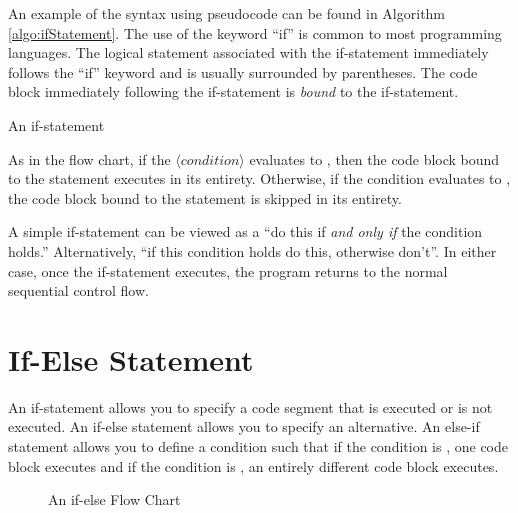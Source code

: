 %

An example of the syntax using pseudocode can be found in Algorithm \ref{algo:ifStatement}.
The use of the keyword ``if'' is common to most programming languages.  The 
logical statement associated with the if-statement immediately follows the 
``if'' keyword and is usually surrounded by parentheses.  The code block 
immediately following the if-statement is \emph{bound} to the if-statement. 

\begin{algorithm}[H]
\caption{An if-statement}
\label{algo:ifStatement}
\end{algorithm}

As in the flow chart, if the $\langle condition\rangle$ evaluates to \True, then the 
code block bound to the statement executes in its entirety.  Otherwise, if the
condition evaluates to \False, the code block bound to the statement is
skipped in its entirety.

A simple if-statement can be viewed as a ``do this if \emph{and only if} 
the condition holds.''  Alternatively, ``if this condition holds do this, otherwise 
don't''.  In either case, once the if-statement executes, the program returns
to the normal sequential control flow.  

\section{If-Else Statement}

An if-statement allows you to specify a code segment that is executed or
is not executed.  An if-else statement allows you to specify an alternative.
An else-if statement allows you to define a condition such that if the 
condition is \True, one code block executes and if the condition is \False, 
an entirely different code block executes.

\begin{figure}
\centering

\caption{An if-else Flow Chart}
\label{figure:ifElseFlowChart}
\end{figure}

%

